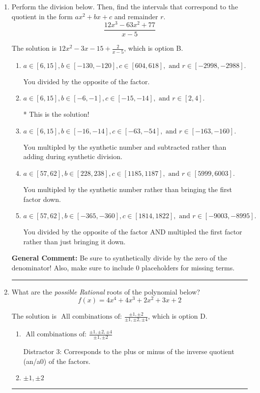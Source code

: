 \documentclass{extbook}[14pt]
\newcommand{\litem}[1]{\item #1

\rule{\textwidth}{0.4pt}}
\begin{document}
\begin{enumerate}\litem{
Perform the division below. Then, find the intervals that correspond to the quotient in the form $ax^2+bx+c$ and remainder $r$.
\[ \frac{12x^{3} -63 x^{2} + 77}{x -5} \]

The solution is \( 12x^{2} -3 x -15 + \frac{2}{x -5} \), which is option B.\begin{enumerate}[label=\Alph*.]
\item \( a \in [6, 15], b \in [-130, -120], c \in [604, 618], \text{ and } r \in [-2998, -2988]. \)

 You divided by the opposite of the factor.
\item \( a \in [6, 15], b \in [-6, -1], c \in [-15, -14], \text{ and } r \in [2, 4]. \)

* This is the solution!
\item \( a \in [6, 15], b \in [-16, -14], c \in [-63, -54], \text{ and } r \in [-163, -160]. \)

 You multipled by the synthetic number and subtracted rather than adding during synthetic division.
\item \( a \in [57, 62], b \in [228, 238], c \in [1185, 1187], \text{ and } r \in [5999, 6003]. \)

 You multipled by the synthetic number rather than bringing the first factor down.
\item \( a \in [57, 62], b \in [-365, -360], c \in [1814, 1822], \text{ and } r \in [-9003, -8995]. \)

 You divided by the opposite of the factor AND multipled the first factor rather than just bringing it down.
\end{enumerate}

\textbf{General Comment:} Be sure to synthetically divide by the zero of the denominator! Also, make sure to include 0 placeholders for missing terms.
}
\litem{
What are the \textit{possible Rational} roots of the polynomial below?
\[ f(x) = 4x^{4} +4 x^{3} +2 x^{2} +3 x + 2 \]

The solution is \( \text{ All combinations of: }\frac{\pm 1,\pm 2}{\pm 1,\pm 2,\pm 4} \), which is option D.\begin{enumerate}[label=\Alph*.]
\item \( \text{ All combinations of: }\frac{\pm 1,\pm 2,\pm 4}{\pm 1,\pm 2} \)

 Distractor 3: Corresponds to the plus or minus of the inverse quotient (an/a0) of the factors. 
\item \( \pm 1,\pm 2 \)


\end{enumerate}}
\end{enumerate}
\end{document}
